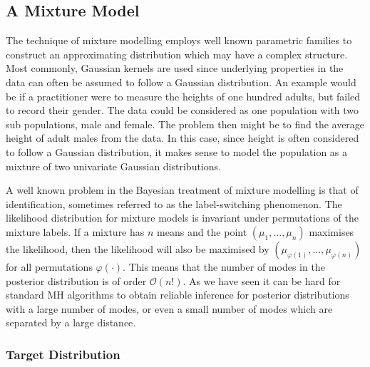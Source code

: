 \documentclass[final]{siamltex}
\begin{document}

\subsection{A Mixture Model}\label{sec:mixture}

The technique of mixture modelling employs well known parametric
families to construct an approximating distribution
which may have a complex structure. Most commonly, Gaussian kernels
are used since underlying properties in the data can often be assumed
to follow a Gaussian distribution. An example would be if a
practitioner were to measure the heights of one hundred adults, but
failed to record their gender. The data could be considered as one
population with two sub populations, male and female. The problem then
might be to find the average height of adult males from the data. In
this case, since height is often considered to follow a Gaussian
distribution, it makes sense to model the population as a mixture of
two univariate Gaussian distributions.

A well known problem in the Bayesian treatment of mixture modelling is
that of identification, sometimes referred to as the label-switching
phenomenon. The likelihood distribution for mixture models is
invariant under permutations of the mixture labels. If a mixture has
$n$ means and the point $(\mu_1, \dots, \mu_n)$ maximises the
likelihood, then the likelihood will also be maximised by
$(\mu_{\varphi(1)}, \dots, \mu_{\varphi(n)})$ for all permutations
$\varphi(\cdot)$. This means that the number of modes in the posterior
distribution is of order $\mathcal{O}(n!)$. As we have seen it can be
hard for standard MH algorithms to obtain reliable inference for
posterior distributions with a large number of modes, or even a small
number of modes which are separated by a large distance.

\subsubsection{Target Distribution}\label{sec:mixture_target}
\end{document}
